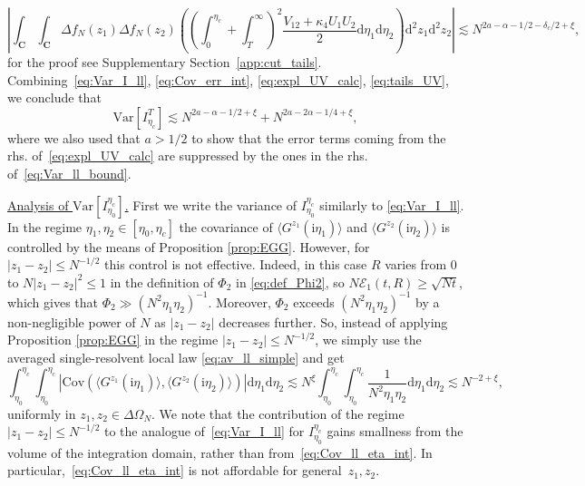\documentclass[10pt]{amsart}
\numberwithin{equation}{section}
\newcommand{\dif}{\mathrm{d}}
\newcommand{\C}{\mathbf{C}}
\newcommand{\Cov}{\mathrm{Cov}}
\newcommand{\Var}{\mathrm{Var}}
\newcommand{\ii}{\mathrm{i}}
\begin{document}
\begin{equation}
\left\vert\int_\C\int_\C \Delta f_N(z_1)\Delta f_N(z_2) \left(\left(\int_0^{\eta_c}+\int_T^\infty\right)^2 \frac{V_{12}+\kappa_4U_1U_2}{2}\dif\eta_1\dif\eta_2\right)\dif^2 z_1\dif^2 z_2\right\vert \lesssim N^{2a-\alpha -1/2-\delta_c/2+\xi},
\label{eq:tails_UV}
\end{equation}
for the proof see Supplementary Section~\ref{app:cut_tails}. Combining~\eqref{eq:Var_I_ll}, \eqref{eq:Cov_err_int}, \eqref{eq:expl_UV_calc}, \eqref{eq:tails_UV}, we conclude that
\begin{equation}
\Var\left[I_{\eta_c}^T\right] \lesssim N^{2a-\alpha-1/2+\xi} + N^{2a-2\alpha-1/4+\xi},
\label{eq:Var_ll_bound}
\end{equation}
where we also used that $a>1/2$ to show that the error terms coming from the rhs. of~\eqref{eq:expl_UV_calc} are suppressed by the ones in the rhs. of~\eqref{eq:Var_ll_bound}.

\medskip

\noindent\underline{Analysis of $\Var\left[I_{\eta_0}^{\eta_c}\right]$.} First we write the variance of $I_{\eta_0}^{\eta_c}$ similarly to \eqref{eq:Var_I_ll}. In the regime $\eta_1,\eta_2\in [\eta_0,\eta_c]$ the covariance of $\langle G^{z_1}(\ii\eta_1)\rangle$ and $\langle G^{z_2}(\ii\eta_2)\rangle$ is controlled by the means of Proposition \ref{prop:EGG}. However, for $|z_1-z_2|\le N^{-1/2}$ this control is not effective. Indeed, in this case $R$ varies from $0$ to $N|z_1-z_2|^2\le 1$ in the definition of $\Phi_2$ in \eqref{eq:def_Phi2}, so $N\mathcal{E}_1(t,R)\ge \sqrt{Nt}$, which gives that $\Phi_2\gg (N^2\eta_1\eta_2)^{-1}$. Moreover, $\Phi_2$ exceeds $(N^2\eta_1\eta_2)^{-1}$ by a non-negligible power of $N$ as $|z_1-z_2|$ decreases further. So, instead of applying Proposition \ref{prop:EGG} in the regime $|z_1-z_2|\le N^{-1/2}$, we simply use the averaged single-resolvent local law \eqref{eq:av_ll_simple} and get
\begin{equation}
\int_{\eta_0}^{\eta_c}\int_{\eta_0}^{\eta_c}\left\vert\Cov\left(\langle G^{z_1}(\ii\eta_1)\rangle,\langle G^{z_2}(\ii\eta_2)\rangle\right)\right\vert\dif\eta_1\dif\eta_2\lesssim N^\xi \int_{\eta_0}^{\eta_c}\int_{\eta_0}^{\eta_c} \frac{1}{N^2\eta_1\eta_2}\dif\eta_1\dif\eta_2\lesssim N^{-2+\xi},
\label{eq:Cov_ll_eta_int}
\end{equation}
uniformly in $z_1,z_2\in\Delta\Omega_N$. We note that the contribution of the regime $|z_1-z_2|\le N^{-1/2}$ to the analogue of~\eqref{eq:Var_I_ll} for $I_{\eta_0}^{\eta_c}$ gains smallness from the volume of the integration domain, rather than from~\eqref{eq:Cov_ll_eta_int}. In particular,~\eqref{eq:Cov_ll_eta_int} is not affordable for general~$z_1,z_2$.
\end{document}
